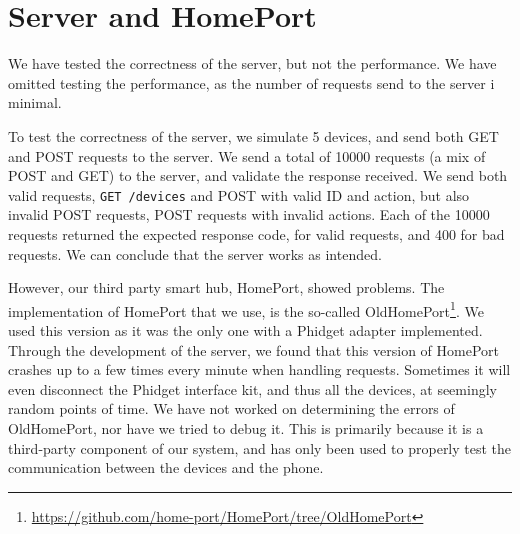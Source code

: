 \section{Server and HomePort}\label{sec:servereval}
We have tested the correctness of the server, 
but not the performance.
We have omitted testing the performance, 
as the number of requests send to the server i minimal. 

To test the correctness of the server, 
we simulate \num{5} devices,
and send both GET and POST requests to the server.
We send a total of \num{10000} requests (a mix of POST and GET) to the server, 
and validate the response received. 
We send both valid requests, 
\ie \texttt{GET /devices} and POST with valid ID and action,
but also invalid POST requests, \ie POST requests with invalid actions. 
Each of the \num{10000} requests returned the expected response code, 
 for valid requests, and 400 for bad requests.
We can conclude that the server works as intended.

However, our third party smart hub, HomePort, showed problems. 
The implementation of HomePort that we use, 
is the so-called OldHomePort\footnote{\url{https://github.com/home-port/HomePort/tree/OldHomePort}}. 
We used this version as it was the only one with a Phidget adapter implemented. 
Through the development of the server, 
we found that this version of HomePort crashes up to a few times every minute when handling requests. 
Sometimes it will even disconnect the Phidget interface kit, 
and thus all the devices, at seemingly random points of time. 
We have not worked on determining the errors of OldHomePort, 
nor have we tried to debug it. 
This is primarily because it is a third-party component of our system, 
and has only been used to properly test the communication between the devices and the phone. 